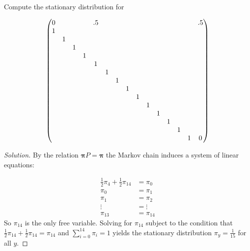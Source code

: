 \documentclass[12pt]{article}
\newenvironment{problem}[2][Problem]{\begin{trivlist}
\item[\hskip \labelsep {\bfseries #1}\hskip \labelsep {\bfseries #2.}]}{\end{trivlist}}
\newenvironment{solution}
  {\begin{proof}[Solution]\renewcommand{\qedsymbol}{}}
  {\end{proof}}
\begin{document}
\begin{problem}{2}

Compute the stationary distribution for

$$
\setcounter{MaxMatrixCols}{20}
\begin{pmatrix}
0 & & & &.5 & & & & & & & & & &.5 \\
1 & & & & & & & & & & & & & & \\
 &1 & & & & & & & & & & & & & \\
 & &1 & & & & & & & & & & & & \\
 & & &1 & & & & & & & & & & & \\
 & & & &1 & & & & & & & & & & \\
 & & & & &1 & & & & & & & & & \\
 & & & & & &1 & & & & & & & & \\
 & & & & & & &1 & & & & & & & \\
 & & & & & & & &1 & & & & & & \\
 & & & & & & & & &1 & & & & & \\
 & & & & & & & & & &1 & & & & \\
 & & & & & & & & & & &1 & & & \\
 & & & & & & & & & & & &1 & & \\
 & & & & & & & & & & & & &1 &0 \\  
\end{pmatrix}
$$

\end{problem}
\begin{solution}
By the relation $\boldsymbol{\pi} P = \boldsymbol{\pi}$ the Markov chain induces a system of linear equations:


\begin{align*}
\frac{1}{2}\pi_4 + \frac{1}{2}\pi_{14} &= \pi_0 \\
\pi_0 &= \pi_1 \\
\pi_1 &= \pi_2 \\
\vdots &= \vdots \\
\pi_{13} & = \pi_{14}
\end{align*}
So $\pi_{14}$ is the only free variable. Solving for $\pi_{14}$ subject to the condition that $\frac{1}{2}\pi_{14} + \frac{1}{2}\pi_{14} = \pi_{14}$ and $\sum_{i=0}^{14}\pi_i = 1$ yields the stationary distribution $\pi_y =\frac{1}{15} $ for all $y$.

\end{solution}
\end{document}
